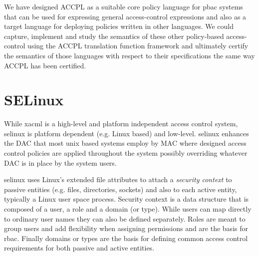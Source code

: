 %
%
%
%

 
We have designed \ac{ACCPL} as a suitable core policy language for \ac{pbac} systems that can be used for expressing general access-control expressions and also as a target language for deploying
policies written in other languages. We could capture, implement and study the semantics of these other policy-based access-control using the \ac{ACCPL} translation function framework and ultimately certify the semantics of those languages with respect to their specifications the same way \ac{ACCPL} has been certified.

\section{SELinux}

While \ac{xacml} is a high-level and platform independent access control system, \ac{selinux} is platform dependent (e.g. Linux based) and low-level. \ac{selinux} enhances the \ac{DAC} that most unix based systems employ by \ac{MAC} where designed access control policies are applied throughout the system possibly overriding whatever \ac{DAC} is in place by the system users. 

\ac{selinux} uses Linux's extended file attributes to attach a \emph{security context} to passive entities (e.g. files, directories, sockets) and also to each active entity, typically a Linux user space process. Security context is a data structure that is composed of a user, a role and a domain (or type). While users can map directly to ordinary user names they can also be defined separately. Roles are meant to group users and add flexibility when assigning permissions and are the basis for \ac{rbac}. Finally domains or types are the basis for defining common access control requirements for both passive and active entities. 


